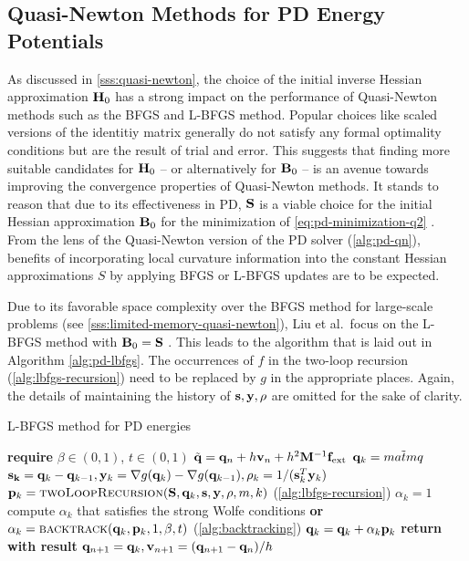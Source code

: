 \subsection{Quasi-Newton Methods for PD Energy Potentials}\label{ss:qn-pd}
As discussed in \cref{sss:quasi-newton}, 
the choice of the initial inverse Hessian approximation $\mathbf{H}_0$ has a strong impact on the performance of Quasi-Newton
methods such as the BFGS and L-BFGS method. Popular choices like scaled versions of the identitiy matrix generally do not
satisfy any formal optimality conditions but are the result of trial and error. This suggests that finding more suitable 
candidates for $\mathbf{H}_0$ -- or alternatively for $\mathbf{B}_0$ -- is an avenue towards improving the convergence properties of 
Quasi-Newton methods. It stands to reason that due to its effectiveness in PD, $\mathbf{S}$ is a viable choice for the 
initial Hessian approximation $\mathbf{B}_0$ for the minimization of \autoref{eq:pd-minimization-q2} \cite{liu2017}. From the lens
of the Quasi-Newton version of the PD solver (\cref{alg:pd-qn}), benefits of incorporating local curvature information into
the constant Hessian approximations $S$ by applying BFGS or L-BFGS updates are to be expected.

Due to its favorable space complexity over the BFGS method for large-scale problems (see \cref{sss:limited-memory-quasi-newton}), 
Liu et al.\ focus on the L-BFGS method with $\mathbf{B}_0 = \mathbf{S}$ \cite{liu2017}. This leads to the algorithm that is laid out in
Algorithm \ref{alg:pd-lbfgs}. The occurrences of $f$ in the two-loop recursion (\cref{alg:lbfgs-recursion}) need to be replaced by $g$ 
in the appropriate places. Again, the details of maintaining the history of $\mathbf{s}, \mathbf{y}, \rho$ are omitted for the sake of clarity.

\begin{algorithm}
\caption{L-BFGS method for PD energies}\label{alg:pd-lbfgs}
\begin{algorithmic}[1]
\State \textbf{require } $\beta \in (0, 1)$, $t \in (0, 1)$
\State $\tilde{\mathbf{q}} = \mathbf{q}_n + h\mathbf{v}_n + h^2\mathbf{M}^{-1}\mathbf{f}_{\text{ext}}$
\State $\mathbf{q}_k = \tilde{matm{q}}$
\State $\mathbf{s_k} = \mathbf{q}_k - \mathbf{q}_{k-1}, \mathbf{y}_k = \nabla g(\mathbf{q}_k) - \nabla g(\mathbf{q}_{k-1}), \rho_k = 1 / (\mathbf{s}^T_k \mathbf{y}_k)$
\State $\mathbf{p}_k = \text{\textsc{twoLoopRecursion}}(\mathbf{S}, \mathbf{q}_k, \mathbf{s}, \mathbf{y}, \rho, m, k)$   (\cref{alg:lbfgs-recursion})
\State $\alpha_k = 1$
\State compute $\alpha_k$ that satisfies the strong Wolfe conditions 
\State \textbf{or} $\alpha_k = \text{\textsc{backtrack}}(\mathbf{q}_k, \mathbf{p}_k, 1, \beta, t)$ (\cref{alg:backtracking})
\EndIf
\State $\mathbf{q}_k = \mathbf{q}_k + \alpha_k \mathbf{p}_k$
\EndFor
\State \textbf{return with result } $\mathbf{q}_{n+1} = \mathbf{q}_k, \mathbf{v}_{n+1} = (\mathbf{q}_{n+1} - \mathbf{q}_n)/h$
\EndProcedure
\end{algorithmic}
\end{algorithm}

